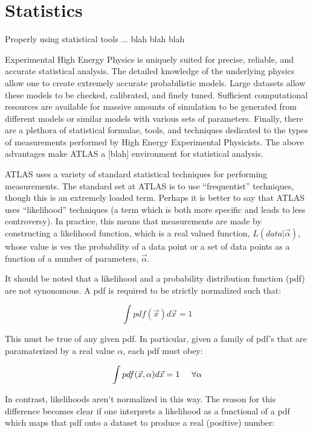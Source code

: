 


\section{Statistics}

Properly using statistical tools ... blah blah blah

Experimental High Energy Physics is uniquely suited for precise, reliable, and accurate statistical analysis.
The detailed knowledge of the underlying physics allow one to create extremely accurate probabilistic models.
Large datasets allow these models to be checked, calibrated, and finely tuned.
Sufficient computational resources are available for massive amounts of simulation to be generated from different models or similar models with various sets of parameters.
Finally, there are a plethora of statistical formulae, tools, and techniques dedicated to the types of measurements performed by High Energy Experimental Physicists.
The above advantages make ATLAS a [blah] environment for statistical analysis.

ATLAS uses a variety of standard statistical techniques for performing measurements.
The standard set at ATLAS is to use ``frequentist'' techniques, though this is an extremely loaded term.
Perhaps it is better to say that ATLAS uses ``likelihood'' techniques (a term which is both more specific and leads to less controversy).
In practice, this means that measurements are made by constructing a likelihood function, which is a real valued function, $L(data | \vec{\alpha})$, whose value is ves the probability of a data point or a set of data points as a function of a number of parameters, $\vec{\alpha}$.

It should be noted that a likelihood and a probability distribution function (pdf) are not synonomous.
A pdf is required to be strictly normalized such that:

\begin{equation}
\int pdf(\vec{x}) d\vec{x} = 1
\end{equation}

This must be true of any given pdf.
In particular, given a family of pdf's that are paramaterized by a real value $\alpha$, each pdf must obey:

\begin{equation}
\int pdf(\vec{x}, \alpha) d\vec{x} = 1 \hspace{5mm} \forall \alpha
\end{equation}

In contrast, likelihoods aren't normalized in this way.
The reason for this difference becomes clear if one interprets a likelihood as a functional of a pdf which maps that pdf onto a dataset to produce a real (positive) number:

